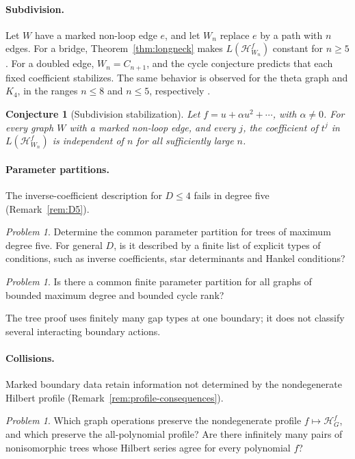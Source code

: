 \documentclass[reqno]{article}
\theoremstyle{plain} %
\newtheorem{conjecture}[theorem]{Conjecture}
\theoremstyle{definition}
\theoremstyle{remark}
\newtheorem{problem}[theorem]{Problem}
\newcommand{\hs}{\mathscr{H}}
\numberwithin{equation}{section}
\begin{document}
\paragraph{Subdivision.}
Let $W$ have a marked non-loop edge $e$, and let $W_n$ replace $e$ by
a path with $n$ edges. For a bridge, Theorem~\ref{thm:longneck} makes
$L(\hs^f_{W_n})$ constant for $n\ge5$. For a doubled edge,
$W_n=C_{n+1}$, and the cycle conjecture predicts that each fixed
coefficient stabilizes. The same behavior is observed for the theta
graph and $K_4$, in the ranges $n\le8$ and $n\le5$, respectively
\cite[\texttt{checks/subdivision.py}]{Cert}.
\begin{conjecture}[Subdivision stabilization]\label{conj:subdivision}
Let $f=u+\alpha u^2+\cdots$, with $\alpha\ne0$. For every graph $W$
with a marked non-loop edge, and every $j$, the coefficient of $t^j$ in
$L(\hs^f_{W_n})$ is independent of $n$ for all sufficiently large $n$.
\end{conjecture}

\paragraph{Parameter partitions.}
The inverse-coefficient description for $D\le4$ fails in degree five
(Remark~\ref{rem:D5}).
\begin{problem}\label{prob:D5}
Determine the common parameter partition for trees of maximum degree
five. For general $D$, is it described by a finite list of explicit
types of conditions, such as inverse coefficients, star determinants and
Hankel conditions?
\end{problem}
\begin{problem}\label{prob:cycle-rank}
Is there a common finite parameter partition for all graphs of bounded
maximum degree and bounded cycle rank?
\end{problem}
The tree proof uses finitely many gap types at one boundary; it does
not classify several interacting boundary actions.

\paragraph{Collisions.}
Marked boundary data retain information not determined by the
nondegenerate Hilbert profile (Remark~\ref{rem:profile-consequences}).
\begin{problem}\label{prob:collisions}
Which graph operations preserve the nondegenerate profile
$f\mapsto\hs_G^f$, and which preserve the all-polynomial profile?
Are there infinitely many pairs of nonisomorphic trees whose Hilbert
series agree for every polynomial $f$?
\end{problem}
\end{document}
